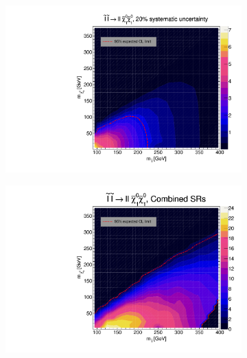 \documentclass[12pt, a4paper]{book}
\begin{document}
\begin{figure}[!ht]
	\centering
	\begin{subfigure}[b]{0.49\textwidth}
      \centering
      \includegraphics[width=1\textwidth]{Limits/SlepSlep/SlepSlep_ll.pdf}
   \end{subfigure}
   \hfill
	\begin{subfigure}[b]{0.49\textwidth}
      \centering
      \includegraphics[width=1\textwidth]{Limits/Model_independent/SlepSlep/SlepSlep_ll.pdf}
   \end{subfigure}
   \hfill
   \begin{subfigure}[b]{0.49\textwidth}
      \centering

\end{subfigure}
\end{figure}
\end{document}
